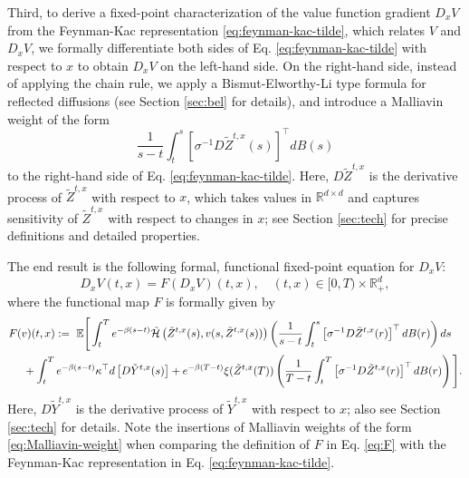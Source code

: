 \documentclass[11pt]{article}
\theoremstyle{definition}
\theoremstyle{plain}
\newcommand{\R}{\mathbb{R}}
\newcommand{\cH}{{\cal H}}
\begin{document}
Third, to derive a fixed-point characterization of the value function gradient $D_x V$ from the Feynman-Kac representation \eqref{eq:feynman-kac-tilde}, 
which relates $V$ and $D_x V$, we formally differentiate both sides of Eq. \eqref{eq:feynman-kac-tilde} with respect to $x$ to obtain $D_x V$ on the left-hand side. 
On the right-hand side, instead of applying the chain rule, we apply a Bismut-Elworthy-Li type formula for reflected diffusions (see Section \ref{sec:bel} for details), 
and introduce a Malliavin weight of the form 
\begin{equation}\label{eq:Malliavin-weight}
\frac{1}{s-t} \int_t^s \left[\sigma^{-1} D \tilde{Z}^{t,x}(s)\right]^{\top} dB(s)
\end{equation}
to the right-hand side of Eq. \eqref{eq:feynman-kac-tilde}. 
Here, $D \tilde{Z}^{t,x}$ is the derivative process of $\tilde{Z}^{t,x}$ with respect to $x$, 
which takes values in $\R^{d\times d}$ and captures sensitivity of $\tilde{Z}^{t,x}$ with respect to changes in $x$; 
see Section \ref{sec:tech} for precise definitions and detailed properties.

The end result is the following formal, functional fixed-point equation for $D_x V$:
\begin{equation}\label{eq:fixed-point}
    D_x V(t,x) = F(D_x V)(t,x), \quad (t,x) \in [0,T) \times \mathbb{R}^d_+,
\end{equation}
where the functional map $F$ is formally given by
\begin{align}
   & F(v)(t,x) :=~\mathbb{E} \Bigg[ \int_t^T e^{-\beta(s-t)} \tilde \cH \left( \tilde{Z}^{t,x}(s), v(s, \tilde{Z}^{t,x}(s))\right) \left(\frac{1}{s - t} \int_t^s \left[\sigma^{-1} D \tilde{Z}^{t,x}(r)\right]^{\top} dB(r)\right) ds \nonumber \\
    & ~~~~ + \int_t^T e^{-\beta(s-t)} \kappa^{\top} d\left[D\tilde Y^{t,x}(s)\right] + e^{-\beta(T-t)}\xi(\tilde{Z}^{t,x}(T)) \left( \frac{1}{T - t} \int_t^T \left[\sigma^{-1} D \tilde{Z}^{t,x}(r)\right]^{\top} dB(r) \right) \Bigg].
    \label{eq:F}
\end{align}
Here, $D\tilde Y^{t,x}$ is the derivative process of $\tilde Y^{t,x}$ with respect to $x$; also see Section \ref{sec:tech} for details. 
Note the insertions of Malliavin weights of the form \eqref{eq:Malliavin-weight} when comparing the definition of $F$ in Eq. \eqref{eq:F} 
with the Feynman-Kac representation in Eq. \eqref{eq:feynman-kac-tilde}. 
\end{document}
